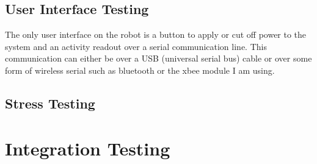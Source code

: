 \subsection{User Interface Testing}
The only user interface on the robot is a button to apply or cut off power to the system and an activity readout over a serial communication line.  This communication can either be over a USB (universal serial bus) cable or over some form of wireless serial such as bluetooth or the xbee module I am using.
\subsection{Stress Testing}

\section{Integration Testing}

